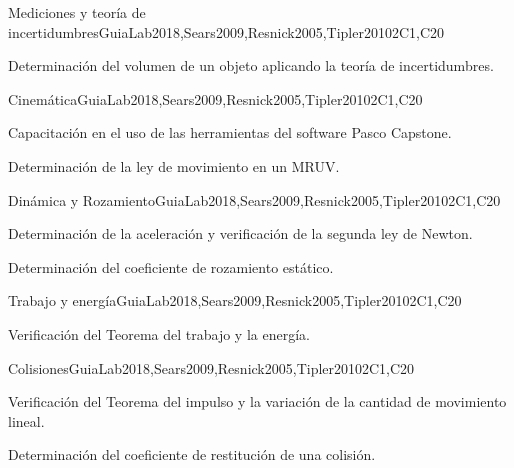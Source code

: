 \begin{syllabus}
\begin{competences}
    \item {}
\end{competences}

\begin{unit}{Mediciones y teoría de incertidumbres}{}{GuiaLab2018,Sears2009,Resnick2005,Tipler2010}{2}{C1,C20}
\begin{topics}
      \item Determinación del volumen de un objeto aplicando la teoría de incertidumbres.
\end{topics}
\end{unit}

\begin{unit}{Cinemática}{}{GuiaLab2018,Sears2009,Resnick2005,Tipler2010}{2}{C1,C20}
\begin{topics}
      \item Capacitación en el uso de las herramientas del software Pasco Capstone.
      \item Determinación de la ley de movimiento en un MRUV.
\end{topics}
\end{unit}

\begin{unit}{Dinámica y Rozamiento}{}{GuiaLab2018,Sears2009,Resnick2005,Tipler2010}{2}{C1,C20}
\begin{topics}
      \item Determinación de la aceleración y verificación de la segunda ley de Newton. 
      \item Determinación del coeficiente de rozamiento estático.
\end{topics}
\end{unit}

\begin{unit}{Trabajo y energía}{}{GuiaLab2018,Sears2009,Resnick2005,Tipler2010}{2}{C1,C20}
\begin{topics}
      \item Verificación del Teorema del trabajo y la energía.
   \end{topics}
\end{unit}

\begin{unit}{Colisiones}{}{GuiaLab2018,Sears2009,Resnick2005,Tipler2010}{2}{C1,C20}
\begin{topics}
	\item Verificación del Teorema del impulso y la variación de la cantidad de movimiento lineal. 
	\item Determinación del coeficiente de restitución de una colisión.
   \end{topics}
\end{unit}


\end{syllabus}
